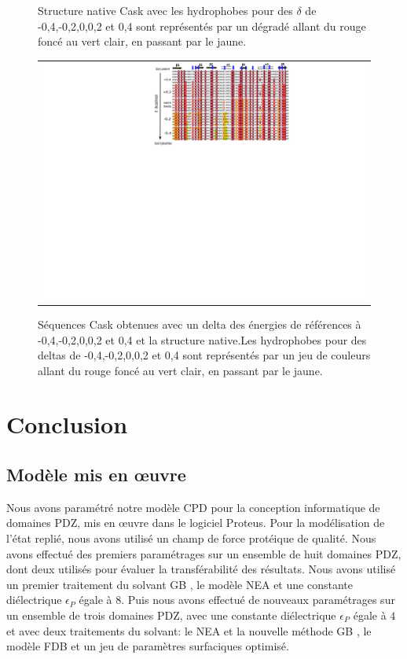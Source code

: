 \begin{figure}[!htbp]
  \centering
  \caption{\small Structure native Cask avec les hydrophobes pour des $\delta$ de -0,4,-0,2,0,0,2 et 0,4 sont représentés par un dégradé allant du rouge foncé au vert clair, en passant par le jaune.}

  \begin{tabular}{c}
    \includegraphics[width=15cm]{titration/alignCASK.png} \\
  \end{tabular}
  
  \caption{\small Séquences Cask obtenues avec un delta des énergies de références à -0,4,-0,2,0,0,2 et 0,4 et la structure native.Les hydrophobes pour des deltas de -0,4,-0,2,0,0,2 et 0,4 sont représentés par un jeu de couleurs allant du rouge foncé au vert clair, en passant par le jaune.}
  \label{titrAlignCask}
\end{figure}





\section{Conclusion}

\subsection{Modèle mis en œuvre}

Nous avons paramétré notre modèle CPD pour la conception informatique de domaines PDZ, mis en œuvre dans le logiciel Proteus. Pour la modélisation de l'état replié, nous avons utilisé un champ de force protéique de qualité. Nous avons effectué des premiers paramétrages sur un ensemble de huit domaines PDZ, dont deux utilisés  pour évaluer la transférabilité des résultats. Nous avons utilisé un premier traitement du solvant \og GB \fg, le modèle NEA et une constante diélectrique $\epsilon_P$  égale à $8$. Puis nous avons effectué de nouveaux paramétrages sur un ensemble de trois domaines PDZ, avec une constante diélectrique $\epsilon_P$  égale à $4$ et avec deux traitements du solvant: le NEA et la nouvelle méthode \og GB \fg, le modèle FDB et un jeu de paramètres surfaciques optimisé.

